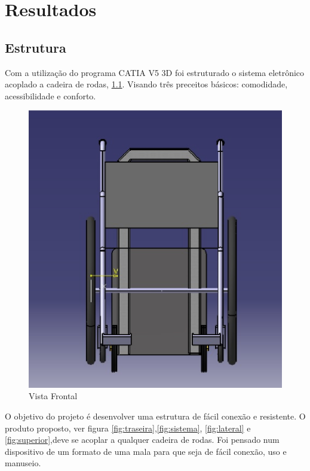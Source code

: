 \chapter[Resultados]{Resultados}

\section{Estrutura}
Com a utilização do programa CATIA V5 3D foi estruturado o sistema eletrônico acoplado a cadeira de rodas, \ref{fig:frontal}. Visando três preceitos básicos: comodidade, acessibilidade e conforto.

\begin{figure}[!htb]
\centering
\includegraphics{figuras/estrutura/vista_frontal}
\caption{Vista Frontal}
\label{fig:frontal}
\end{figure}

O objetivo do projeto é desenvolver uma estrutura de fácil conexão e  resistente. O produto proposto, ver figura \ref{fig:traseira},\ref{fig:sistema}, \ref{fig:lateral} e \ref{fig:superior},deve se acoplar a qualquer cadeira de rodas. Foi pensado num dispositivo de um formato de uma mala para que seja de fácil conexão, uso e manuseio.

